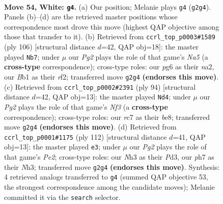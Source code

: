 \documentclass[11pt]{article}
\begin{document}
\clearpage

\begin{figure}[p]\centering
\begin{subfigure}{0.46\textwidth}\centering
\resizebox{\linewidth}{!}{%
\newchessgame
\chessboard[
  setfen={6k1/2r2p1p/b5p1/4Pp2/1n3P2/7N/5KPP/1B6 w - - 2 54},
  showmover=false,
  pgfstyle=straightmove, color=movearrow, markmove={g2-g4}
]}
\caption{}
\end{subfigure}\hfill
\begin{subfigure}{0.46\textwidth}\centering
\resizebox{\linewidth}{!}{%
\newchessgame
\chessboard[
  setfen={R7/6pk/5p1p/N7/Pp6/1P1K4/n1P2r1P/8 w - - 3 54},
  showmover=false,
  pgfstyle=straightmove, color=movearrow, markmove={a5-b7}
]}
\caption{}
\end{subfigure}
\\[4pt]
\begin{subfigure}{0.46\textwidth}\centering
\resizebox{\linewidth}{!}{%
\newchessgame
\chessboard[
  setfen={4b3/1p4p1/p5k1/P1n1P2p/2B4P/5N2/5K2/8 w - - 2 48},
  showmover=false,
  pgfstyle=straightmove, color=movearrow, markmove={f3-d4}
]}
\caption{}
\end{subfigure}\hfill
\begin{subfigure}{0.46\textwidth}\centering
\resizebox{\linewidth}{!}{%
\newchessgame
\chessboard[
  setfen={8/4b3/4k1p1/2p1p2p/8/1nBP1PPN/4P3/4K3 w - - 8 57},
  showmover=false,
  pgfstyle=straightmove, color=movearrow, markmove={e2-e3}
]}
\caption{}
\end{subfigure}
\caption{\textbf{Move 54, White: \texttt{g4}.} (a) Our position; Melanie plays \texttt{g4} (\texttt{g2g4}). Panels (b)--(d) are the retrieved master positions whose correspondence most drove this move (highest QAP objective among those that transfer to it). (b) Retrieved from \texttt{ccrl\_top\_p0003\#1589} (ply 106) [structural distance $d$=42, QAP obj=18]: the master played \texttt{Nb7}; under $\mu$ our \emph{Pg2} plays the role of that game's \emph{Na5} (a \textbf{cross-type} correspondence); cross-type roles: our \emph{p}g6 as their \emph{n}a2, our \emph{B}b1 as their \emph{r}f2; transferred move \texttt{g2g4} \textbf{(endorses this move)}. (c) Retrieved from \texttt{ccrl\_top\_p0002\#2391} (ply 94) [structural distance $d$=42, QAP obj=13]: the master played \texttt{Nd4}; under $\mu$ our \emph{Pg2} plays the role of that game's \emph{Nf3} (a \textbf{cross-type} correspondence); cross-type roles: our \emph{r}c7 as their \emph{b}e8; transferred move \texttt{g2g4} \textbf{(endorses this move)}. (d) Retrieved from \texttt{ccrl\_top\_p0001\#1175} (ply 112) [structural distance $d$=41, QAP obj=13]: the master played \texttt{e3}; under $\mu$ our \emph{Pg2} plays the role of that game's \emph{Pe2}; cross-type roles: our \emph{N}h3 as their \emph{P}d3, our \emph{p}h7 as their \emph{N}h3; transferred move \texttt{g2g4} \textbf{(endorses this move)}. Synthesis: 4 retrieved analogs transferred to \texttt{g4} (summed QAP objective 53, the strongest correspondence among the candidate moves); Melanie committed it via the \texttt{search} selector.}
\label{fig:thought-m106}
\end{figure}
\end{document}
